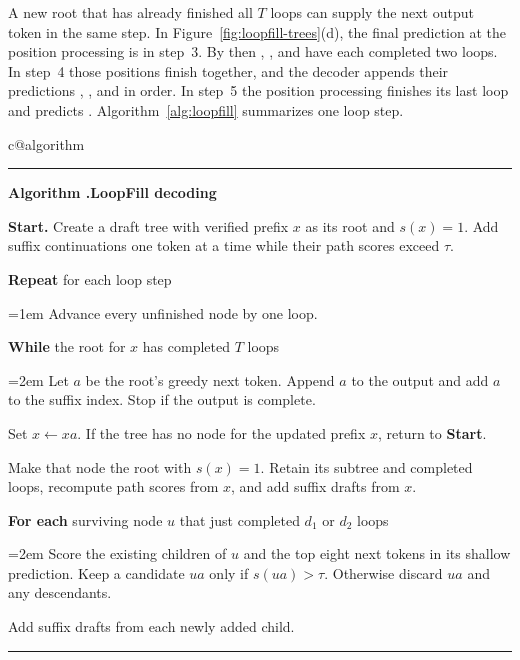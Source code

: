 A new root that has already finished all $T$ loops can supply the next
output token in the same step. In Figure~\ref{fig:loopfill-trees}(d),
the final prediction at the position processing  is
 in step~3. By then , , and
 have each completed two loops. In step~4 those positions
finish together, and the decoder appends their predictions
, , and  in order. In step~5 the position
processing  finishes its last loop and predicts
. Algorithm~\ref{alg:loopfill} summarizes
one loop step.

\ifcsname c@algorithm\endcsname\else{}\fi
\par\medskip
\noindent\begin{minipage}{\linewidth}
\label{alg:loopfill}
\hrule\smallskip
\textbf{Algorithm \thealgorithm.\quad LoopFill decoding}\par
\smallskip
\textbf{Start.} Create a draft tree with verified prefix $x$ as its root
and $s(x)=1$. Add suffix continuations one token at a time while their
path scores exceed $\tau$.\par
\smallskip
\textbf{Repeat} for each loop step\par
{\leftskip=1em\relax
Advance every unfinished node by one loop.\par
\textbf{While} the root for $x$ has completed $T$ loops\par
{\leftskip=2em\relax
Let $a$ be the root's greedy next token. Append $a$ to the output and
add $a$ to the suffix index. Stop if the output is complete.\par
Set $x\gets xa$. If the tree has no node for the updated prefix $x$,
return to \textbf{Start}.\par
Make that node the root with $s(x)=1$. Retain its subtree and completed
loops, recompute path scores from $x$, and add suffix drafts from $x$.\par}
\textbf{For each} surviving node $u$ that just completed $d_1$ or $d_2$ loops\par
{\leftskip=2em\relax
Score the existing children of $u$ and the top eight next tokens in its
shallow prediction. Keep a candidate $ua$ only if $s(ua)>\tau$.
Otherwise discard $ua$ and any descendants.\par
Add suffix drafts from each newly added child.\par}}
\smallskip\hrule
\end{minipage}\par
